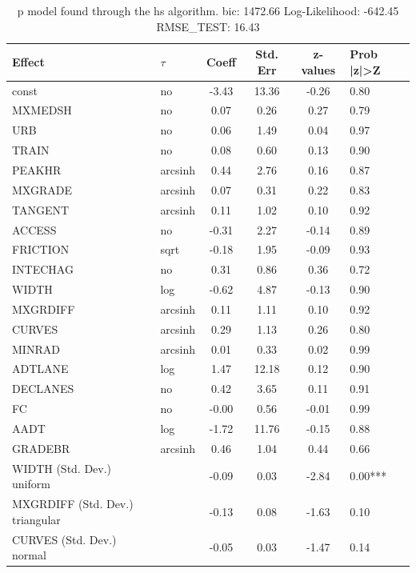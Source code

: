 \begin{table}
	\caption{p model found through the hs algorithm. bic: 1472.66 Log-Likelihood: -642.45 RMSE_TEST: 16.43}
	\begin{center}
		\begin{tabular}{|l|l|c|c|c|l|}
			\hline
			Effect & $\tau$ & Coeff & Std. Err & z-values & Prob |z|>Z \\
			\hline
			const & no & -3.43 & 13.36 & -0.26 & 0.80 \\
			\hline
			MXMEDSH & no & 0.07 & 0.26 & 0.27 & 0.79 \\
			\hline
			URB & no & 0.06 & 1.49 & 0.04 & 0.97 \\
			\hline
			TRAIN & no & 0.08 & 0.60 & 0.13 & 0.90 \\
			\hline
			PEAKHR & arcsinh & 0.44 & 2.76 & 0.16 & 0.87 \\
			\hline
			MXGRADE & arcsinh & 0.07 & 0.31 & 0.22 & 0.83 \\
			\hline
			TANGENT & arcsinh & 0.11 & 1.02 & 0.10 & 0.92 \\
			\hline
			ACCESS & no & -0.31 & 2.27 & -0.14 & 0.89 \\
			\hline
			FRICTION & sqrt & -0.18 & 1.95 & -0.09 & 0.93 \\
			\hline
			INTECHAG & no & 0.31 & 0.86 & 0.36 & 0.72 \\
			\hline
			WIDTH & log & -0.62 & 4.87 & -0.13 & 0.90 \\
			\hline
			MXGRDIFF & arcsinh & 0.11 & 1.11 & 0.10 & 0.92 \\
			\hline
			CURVES & arcsinh & 0.29 & 1.13 & 0.26 & 0.80 \\
			\hline
			MINRAD & arcsinh & 0.01 & 0.33 & 0.02 & 0.99 \\
			\hline
			ADTLANE & log & 1.47 & 12.18 & 0.12 & 0.90 \\
			\hline
			DECLANES & no & 0.42 & 3.65 & 0.11 & 0.91 \\
			\hline
			FC & no & -0.00 & 0.56 & -0.01 & 0.99 \\
			\hline
			AADT & log & -1.72 & 11.76 & -0.15 & 0.88 \\
			\hline
			GRADEBR & arcsinh & 0.46 & 1.04 & 0.44 & 0.66 \\
			\hline
			WIDTH (Std. Dev.) uniform &  & -0.09 & 0.03 & -2.84 & 0.00*** \\
			\hline
			MXGRDIFF (Std. Dev.) triangular &  & -0.13 & 0.08 & -1.63 & 0.10 \\
			\hline
			CURVES (Std. Dev.) normal &  & -0.05 & 0.03 & -1.47 & 0.14 \\

\end{tabular}
\end{center}
\end{table}
